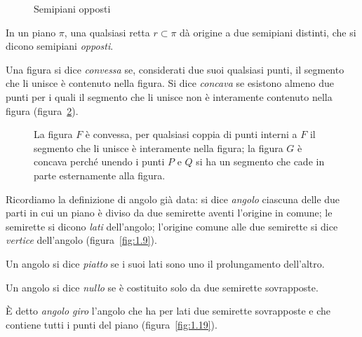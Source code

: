 \begin{inaccessibleblock}
 \begin{figure}[bth]
 \centering
  \caption{Semipiani opposti}\label{fig:1.17}
\end{figure}
\end{inaccessibleblock}
In un piano ${\pi}$, una qualsiasi retta $r \subset \pi$ dà origine a 
due semipiani distinti, che si dicono semipiani \emph{opposti}.

\begin{definizione}
Una figura si dice \emph{convessa} se, considerati due suoi qualsiasi 
punti, il segmento che li unisce è contenuto nella figura. Si dice 
\emph{concava} se esistono almeno due punti per i quali il segmento 
che li unisce non è interamente contenuto nella figura 
(figura~\ref{fig:1.18}).
\end{definizione}

\begin{inaccessibleblock}
 \begin{figure}[bth]
 \centering 
 \caption{La figura $ F $ è convessa, per qualsiasi coppia di punti 
interni a $ F $ il segmento che li unisce è interamente nella figura; 
la figura $ G $ è concava perché unendo i punti $ P $ e $ Q $ si ha 
un segmento che cade in parte esternamente alla 
figura.}\label{fig:1.18}
\end{figure}
\end{inaccessibleblock}

Ricordiamo la definizione di angolo già data: si dice \emph{angolo} 
ciascuna delle due parti in cui un piano è diviso da due semirette 
aventi l'origine in comune; le semirette si dicono \emph{lati} 
dell'angolo; l'origine comune alle due semirette si dice 
\emph{vertice} dell'angolo (figura~\ref{fig:1.9}).

\begin{definizione}
Un angolo si dice \emph{piatto} se i suoi lati sono uno il 
prolungamento dell'altro.
\end{definizione}

\begin{definizione}
Un angolo si dice \emph{nullo} se è costituito solo da due semirette 
sovrapposte.
\end{definizione}

\begin{definizione}
\`E detto \emph{angolo giro} l'angolo che ha per lati due semirette 
sovrapposte e che contiene tutti i punti del piano 
(figura~\ref{fig:1.19}).
\end{definizione}

